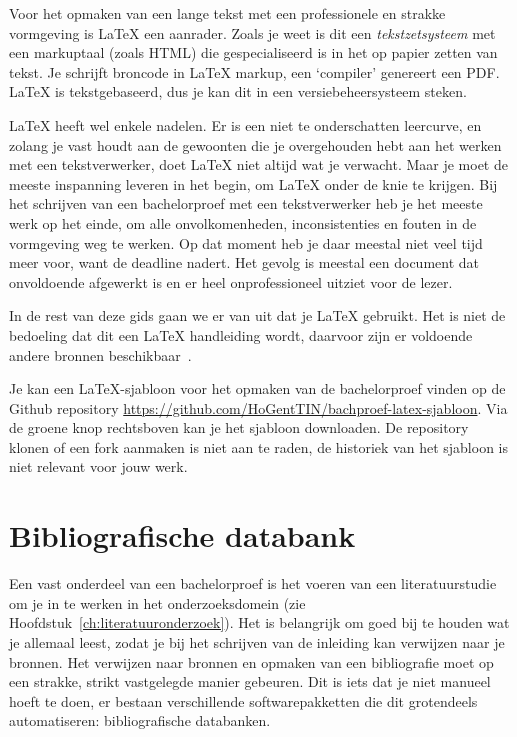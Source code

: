 Voor het opmaken van een lange tekst met een professionele en strakke vormgeving is {\LaTeX} een aanrader. Zoals je weet is dit een \emph{tekstzetsysteem} met een markuptaal (zoals HTML) die gespecialiseerd is in het op papier zetten van tekst. Je schrijft broncode in LaTeX markup, een `compiler' genereert een PDF. {\LaTeX} is tekstgebaseerd, dus je kan dit in een versiebeheersysteem steken.

{\LaTeX} heeft wel enkele nadelen. Er is een niet te onderschatten leercurve, en zolang je vast houdt aan de gewoonten die je overgehouden hebt aan het werken met een tekstverwerker, doet {\LaTeX} niet altijd wat je verwacht. Maar je moet de meeste inspanning leveren in het begin, om {\LaTeX} onder de knie te krijgen. Bij het schrijven van een bachelorproef met een tekstverwerker heb je het meeste werk op het einde, om alle onvolkomenheden, inconsistenties en fouten in de vormgeving weg te werken. Op dat moment heb je daar meestal niet veel tijd meer voor, want de deadline nadert. Het gevolg is meestal een document dat onvoldoende afgewerkt is en er heel onprofessioneel uitziet voor de lezer.

In de rest van deze gids gaan we er van uit dat je {\LaTeX} gebruikt. Het is niet de bedoeling dat dit een {\LaTeX} handleiding wordt, daarvoor zijn er voldoende andere bronnen beschikbaar~\parencite{Oetiker2015}.

Je kan een {\LaTeX}-sjabloon voor het opmaken van de bachelorproef vinden op de Github repository \url{https://github.com/HoGentTIN/bachproef-latex-sjabloon}. Via de groene knop rechtsboven kan je het sjabloon downloaden. De repository klonen of een fork aanmaken is niet aan te raden, de historiek van het sjabloon is niet relevant voor jouw werk.


\section{Bibliografische databank}
\label{sec:bibliografische-databank}

Een vast onderdeel van een bachelorproef is het voeren van een literatuurstudie om je in te werken in het onderzoeksdomein (zie Hoofdstuk~\ref{ch:literatuuronderzoek}). Het is belangrijk om goed bij te houden wat je allemaal leest, zodat je bij het schrijven van de inleiding kan verwijzen naar je bronnen. Het verwijzen naar bronnen en opmaken van een bibliografie moet op een strakke, strikt vastgelegde manier gebeuren. Dit is iets dat je niet manueel hoeft te doen, er bestaan verschillende softwarepakketten die dit grotendeels automatiseren: bibliografische databanken.

